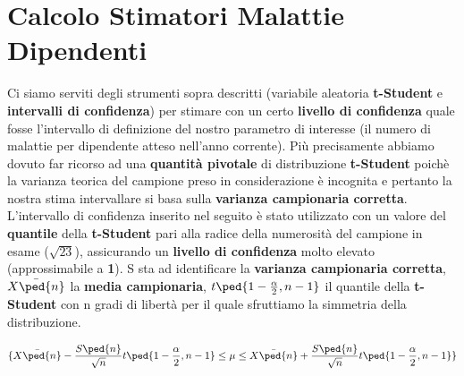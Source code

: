   \chapter{Calcolo Stimatori Malattie Dipendenti}
  \label{sec:stimatori_malattie_dipendenti}	
	Ci siamo serviti degli strumenti sopra descritti (variabile aleatoria \textbf{t-Student} e \textbf{intervalli di confidenza}) per stimare con un certo \textbf{livello di confidenza} quale fosse l'intervallo di definizione del nostro parametro di interesse (il numero di malattie per dipendente atteso nell'anno corrente). Più precisamente abbiamo dovuto far ricorso ad una \textbf{quantità pivotale} di distribuzione \textbf{t-Student} poichè la varianza teorica del campione preso in considerazione è incognita e pertanto la nostra stima intervallare si basa sulla \textbf{varianza campionaria corretta}. L'intervallo di confidenza inserito nel seguito è stato utilizzato con un valore del \textbf{quantile} della \textbf{t-Student} pari alla radice della numerosità del campione in esame ($\sqrt{23}$), assicurando un \textbf{livello di confidenza} molto elevato (approssimabile a \textbf{1}). S sta ad identificare la \textbf{varianza campionaria corretta}, $\bar{X\ped{n}}$ la \textbf{media campionaria}, $t\ped{1-\frac{\alpha}{2},n-1}$ il quantile della \textbf{t-Student} con n gradi di libertà per il quale sfruttiamo la simmetria della distribuzione.

\[
\{\bar{X\ped{n}} - \frac{S\ped{n}}{\sqrt{n}}t\ped{1-\frac{\alpha}{2},n-1} \leq \mu \leq \bar{X\ped{n}} + \frac{S\ped{n}}{\sqrt{n}}t\ped{1-\frac{\alpha}{2},n-1}\}
\]